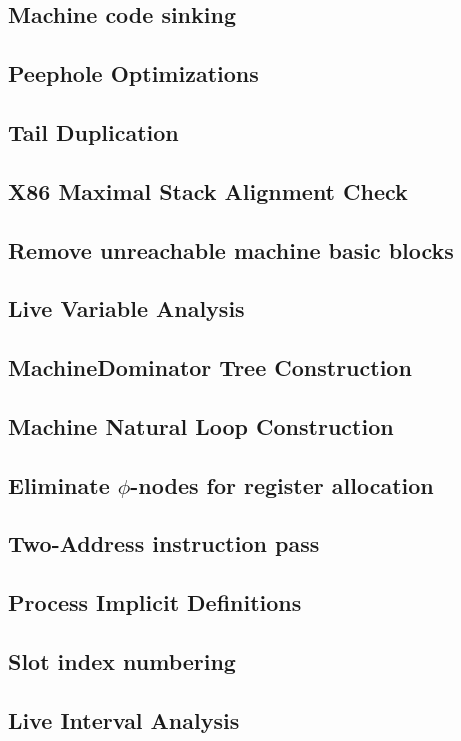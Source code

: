 \documentclass{myproc}
\begin{document}
\subsection{Machine code sinking}
\subsection{Peephole Optimizations}
\subsection{Tail Duplication}
\subsection{X86 Maximal Stack Alignment Check}
\subsection{Remove unreachable machine basic blocks}
\subsection{Live Variable Analysis}
\subsection{MachineDominator Tree Construction}
\subsection{Machine Natural Loop Construction}
\subsection{Eliminate $\phi$-nodes for register allocation}
\subsection{Two-Address instruction pass}
\subsection{Process Implicit Definitions}
\subsection{Slot index numbering}
\subsection{Live Interval Analysis}
\end{document}

